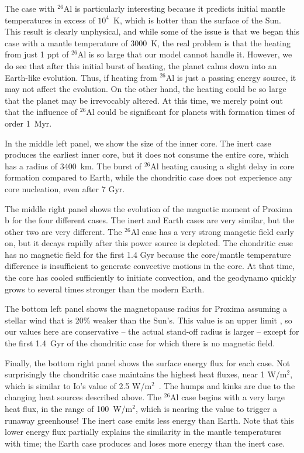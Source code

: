 \documentclass[preprint,12pt]{aastex}
\newcommand{\xxx}[1]{{\color{red} #1}} %
\begin{document}
The case with $^{26}$Al is particularly interesting because it
predicts initial mantle temperatures in excess of $10^4$~K, which is
hotter than the \xxx{surface of the} Sun. This result is clearly unphysical, and while some of the
issue is that we began this case with a mantle temperature of 3000~K,
the real problem is that the heating from just 1 ppt of $^{26}$Al is
so large that our model cannot handle it. However, we do see that
after this initial burst of heating, the planet calms down into an
Earth-like evolution. Thus, if heating from $^{26}$Al is just a
passing energy source, it may not affect the evolution. On the other
hand, the heating could be so large that the planet may be irrevocably
altered. At this time, we merely point out that the influence of
$^{26}$Al could be significant for planets with formation times of
order 1~Myr.

In the middle left panel, we show the size of the inner core. The
inert case produces the earliest inner core, but it does not consume the
entire core, which has a radius of 3400~km. The burst of $^{26}$Al
heating causing a slight delay in core formation compared to Earth,
while the chondritic case does not experience any core nucleation, even
after 7 Gyr.

The middle right panel shows the evolution of the magnetic moment of
Proxima b for the four different cases. The inert and Earth cases are
very similar, but the other two are very different. The $^{26}$Al case
has a very strong mangetic field early on, but it decays rapidly after
this power source is depleted. The chondritic case has no magnetic
field for the first 1.4 Gyr because the core/mantle temperature
difference is insufficient to generate convective motions in the
core. At that time, the core has cooled sufficiently to initiate
convection, and the geodynamo quickly grows to several times stronger
than the modern Earth.

The bottom left panel shows the magnetopause radius for Proxima
assuming a stellar wind that is 20\% weaker than the Sun's. This value
is an upper limit \citep{Wood01}, so our values here are conservative
-- the actual stand-off radius is larger -- except for the first
1.4~Gyr of the chondritic case for which there is no magnetic field.

Finally, the bottom right panel shows the surface energy flux for each
case. Not surprisingly the chondritic case maintains the highest heat
fluxes, near 1 W/m$^2$, which is similar to Io's value of 2.5
W/m$^2$~\citep{Veeder94}. The humps and kinks are due to the changing
heat sources described above. The $^{26}$Al case begins with a very
large heat flux, in the range of 100~W/m$^2$, which is nearing the
value to trigger a runaway greenhouse! The inert case emits less
energy than Earth. Note that this lower energy flux partially explains
the similarity in the mantle temperatures with time; the Earth case
produces and loses more energy than the inert case.
\end{document}
